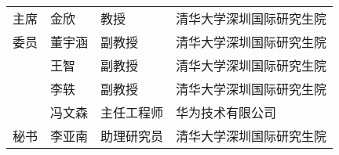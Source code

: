 \begin{committee}[name={学位论文公开评阅人和答辩委员会名单}]
  \begin{center}
    \begin{tabular}{C{2.75cm}C{2.98cm}C{3.63cm}C{5.63cm}@{}}
      主席 & 金欣                  & 教授                    & 清华大学深圳国际研究生院       \\
      委员 & 董宇涵                  & 副教授                    & 清华大学深圳国际研究生院       \\
          & 王智                  & 副教授                    & 清华大学深圳国际研究生院       \\
          & 李轶                  & 副教授                  & 清华大学深圳国际研究生院       \\
          & 冯文森                &  主任工程师              & 华为技术有限公司 \\
      秘书 &   李亚南                &   助理研究员            & 清华大学深圳国际研究生院       \\
    \end{tabular}
  \end{center}

\end{committee}



